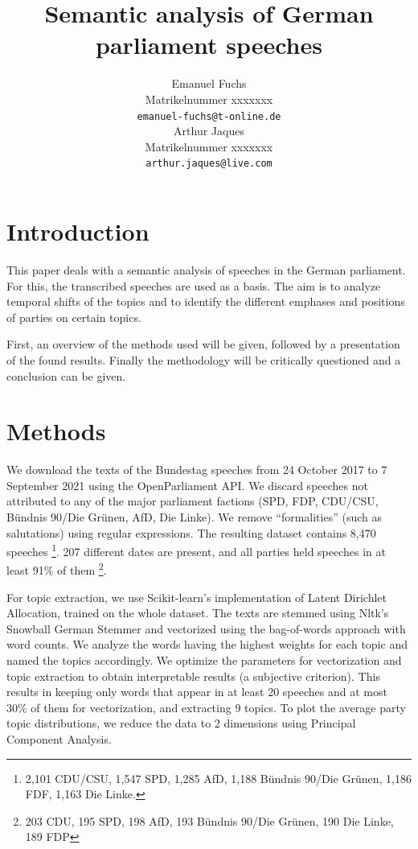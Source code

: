 \documentclass{article}
\title{Semantic analysis of German parliament speeches}
\author{%
  Emanuel Fuchs\\
  Matrikelnummer xxxxxxx\\
  \texttt{emanuel-fuchs@t-online.de} \\
  \And
  Arthur Jaques\\
  Matrikelnummer xxxxxxx\\
  \texttt{arthur.jaques@live.com} \\
}
\begin{document}
\maketitle

\section{Introduction}
This paper deals with a semantic analysis of speeches in the German parliament. 
For this, the transcribed speeches are used as a basis.
The aim is to analyze temporal shifts of the topics and to identify the different emphases and positions of parties on certain topics.

First, an overview of the methods used will be given, followed by a presentation of the found results. 
Finally the methodology will be critically questioned and a conclusion can be given.


\section{Methods}
We download the texts of the Bundestag speeches from 24 October 2017 to 7 September 2021 using the OpenParliament \cite{OpenParliamentTV} API.
We discard speeches not attributed to any of the major parliament factions (SPD, FDP, CDU/CSU, Bündnis 90/Die Grünen, AfD, Die Linke).
We remove ``formalities'' (such as salutations) using regular expressions.
The resulting dataset contains 8,470 speeches
\footnote{2,101 CDU/CSU, 1,547 SPD, 1,285 AfD, 1,188 Bündnis 90/Die Grünen, 1,186 FDF, 1,163 Die Linke.}.
207 different dates are present, and all parties held speeches in at least 91\% of them
\footnote{203 CDU, 195 SPD, 198 AfD, 193 Bündnis 90/Die Grünen, 190 Die Linke, 189 FDP}.

For topic extraction, we use Scikit-learn's \cite{Scikit-learn} implementation of Latent Dirichlet Allocation, trained on the whole dataset.
The texts are stemmed using Nltk's \cite{Nltk} Snowball German Stemmer and vectorized using the bag-of-words approach with word counts.
We analyze the words having the highest weights for each topic and named the topics accordingly.
We optimize the parameters for vectorization and topic extraction to obtain interpretable results (a subjective criterion).
This results in keeping only words that appear in at least 20 speeches and at most 30\% of them for vectorization, and extracting 9 topics.
To plot the average party topic distributions, we reduce the data to 2 dimensions using Principal Component Analysis.
\end{document}
